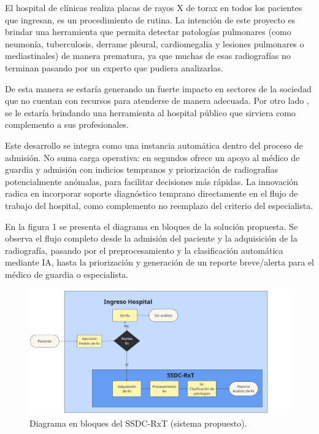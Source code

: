 \documentclass[
11pt, %
]{charter}
\begin{document}
El hospital de clínicas realiza placas de rayos X de torax en todos los pacientes que ingresan, es un procedimiento de rutina. La intención de este proyecto es brindar una herramienta que permita detectar patologías pulmonares (como neumonía, tuberculosis, derrame pleural, cardiomegalia y lesiones pulmonares o mediastinales)  de manera prematura, ya que muchas de esas radiografías no terminan pasando por un experto que pudiera analizarlas. 

De esta manera se estaría generando un fuerte impacto en sectores de la sociedad que no cuentan con recursos para atenderse de manera adecuada. Por otro lado , se le estaría brindando una herramienta al hospital público que sirviera como complemento a sus profesionales.

Este desarrollo se integra como una instancia automática dentro del proceso de admisión. No suma carga operativa: en segundos ofrece un apoyo al médico de guardia y admisión con indicios tempranos y priorización de radiografías potencialmente anómalas, para facilitar decisiones más rápidas. La innovación radica en incorporar soporte diagnóstico temprano directamente en el flujo de trabajo del hospital, como complemento no reemplazo del criterio del especialista.


En la figura 1 se presenta el diagrama en bloques de la solución propuesta. Se observa el flujo completo desde la admisión del paciente y la adquisición de la radiografía, pasando por el preprocesamiento y la clasificación automática mediante IA, hasta la priorización y generación de un reporte breve/alerta para el médico de guardia o especialista.
 
\vspace{25px}
\begin{figure}[htpb]
\centering 
\includegraphics[width=1.1\textwidth]{./Figuras/diagBloques.pdf}
\caption{Diagrama en bloques del SSDC-RxT (sistema propuesto).}
\label{fig:diagBloques}
\end{figure}
\end{document}
